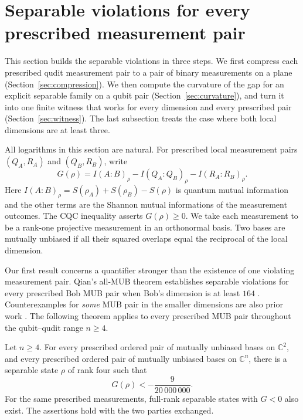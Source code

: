 \section{Separable violations for every prescribed measurement pair}
\label{sec:allmub}

This section builds the separable violations in three steps. We first
compress each prescribed qudit measurement pair to a pair of binary
measurements on a plane (Section~\ref{sec:compression}). We then compute
the curvature of the gap for an explicit separable family on a qubit pair
(Section~\ref{sec:curvature}), and turn it into one finite witness that
works for every dimension and every prescribed pair
(Section~\ref{sec:witness}). The last subsection treats the case where both
local dimensions are at least three.

All logarithms in this section are natural.  For prescribed local
measurement pairs $(Q_A,R_A)$ and $(Q_B,R_B)$, write
\begin{equation}
 G(\rho)=I(A:B)_\rho-I(Q_A:Q_B)_\rho-I(R_A:R_B)_\rho.
 \label{eq:cqc-gap}
\end{equation}
Here $I(A:B)_\rho=S(\rho_A)+S(\rho_B)-S(\rho)$ is quantum mutual
information and the other terms are the Shannon mutual informations of
the measurement outcomes.  The CQC inequality asserts $G(\rho)\geq0$.
We take each measurement to be a rank-one projective measurement in an
orthonormal basis.  Two bases are mutually unbiased if all their squared
overlaps equal the reciprocal of the local dimension.

Our first result concerns a quantifier stronger than the existence of
one violating measurement pair.  Qian's all-MUB theorem establishes
separable violations for every prescribed Bob MUB pair when Bob's
dimension is at least $164$ \cite[Theorem~4.1]{qian}.
Counterexamples for \emph{some} MUB pair in the smaller dimensions are
also prior work \cite{qian}.  The following theorem applies to every
prescribed MUB pair throughout the qubit--qudit range $n\geq4$.

\begin{theorem}
\label{thm:allmub-qubit}
 Let $n\geq4$.  For every prescribed ordered pair of mutually unbiased
 bases on $\mathbb C^2$, and every prescribed ordered pair of mutually
 unbiased bases on $\mathbb C^n$, there is a separable state $\rho$ of
 rank four such that
 \begin{equation}
  G(\rho)<-\frac{9}{20\,000\,000}.
  \label{eq:uniform-cqc-margin}
 \end{equation}
 For the same prescribed measurements, full-rank separable states with
 $G<0$ also exist.  The assertions hold with the two parties exchanged.
\end{theorem}

